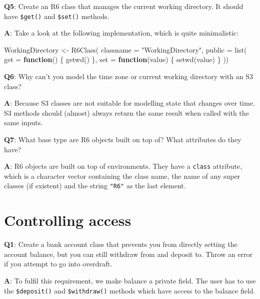 \documentclass[
]{krantz}
\makeatletter
\newenvironment{Shaded}{\begin{snugshade}}{\end{snugshade}}
\newcommand{\ControlFlowTok}[1]{\textcolor[rgb]{0.13,0.29,0.53}{\textbf{#1}}}
\newcommand{\DataTypeTok}[1]{\textcolor[rgb]{0.13,0.29,0.53}{#1}}
\newcommand{\KeywordTok}[1]{\textcolor[rgb]{0.13,0.29,0.53}{\textbf{#1}}}
\newcommand{\NormalTok}[1]{#1}
\newcommand{\StringTok}[1]{\textcolor[rgb]{0.31,0.60,0.02}{#1}}
\newenvironment{kframe}{%
\medskip{}
\setlength{\fboxsep}{.8em}
 \def\at@end@of@kframe{}%
 \ifinner\ifhmode%
  \def\at@end@of@kframe{\end{minipage}}%
  \begin{minipage}{\columnwidth}%
 \fi\fi%
 \def\FrameCommand##1{\hskip\@totalleftmargin \hskip-\fboxsep
 \colorbox{shadecolor}{##1}\hskip-\fboxsep
     \hskip-\linewidth \hskip-\@totalleftmargin \hskip\columnwidth}%
 \MakeFramed {\advance\hsize-\width
   \@totalleftmargin\z@ \linewidth\hsize
   \@setminipage}}%
 {\par\unskip\endMakeFramed%
 \at@end@of@kframe}
\renewenvironment{Shaded}{\begin{kframe}}{\end{kframe}}
\renewcommand{\KeywordTok} [1]{\textcolor[rgb]{0.00,0.44,0.13}{{#1}}}
\renewcommand{\DataTypeTok}[1]{\textcolor[rgb]{0.56,0.13,0.00}{{#1}}}
\renewcommand{\StringTok}  [1]{\textcolor[rgb]{0.25,0.44,0.63}{{#1}}}
\renewcommand{\NormalTok}  [1]{{#1}}
\makeatother
\begin{document}
\textbf{{Q5}}: Create an R6 class that manages the current working directory. It should have \texttt{\$get()} and \texttt{\$set()} methods.

\textbf{{A}}: Take a look at the following implementation, which is quite minimalistic:

\begin{Shaded}
\begin{Highlighting}[]
\NormalTok{WorkingDirectory <-}\StringTok{ }\KeywordTok{R6Class}\NormalTok{(}
  \DataTypeTok{classname =} \StringTok{"WorkingDirectory"}\NormalTok{, }
  \DataTypeTok{public =} \KeywordTok{list}\NormalTok{(}
    \DataTypeTok{get =} \ControlFlowTok{function}\NormalTok{() \{}
      \KeywordTok{getwd}\NormalTok{()}
\NormalTok{    \},}
    \DataTypeTok{set =} \ControlFlowTok{function}\NormalTok{(value) \{}
      \KeywordTok{setwd}\NormalTok{(value)}
\NormalTok{    \}}
\NormalTok{  ))}
\end{Highlighting}
\end{Shaded}

\textbf{{Q6}}: Why can't you model the time zone or current working directory with an S3 class?

\textbf{{A}}: Because S3 classes are not suitable for modelling state that changes over time. S3 methods should (almost) always return the same result when called with the same inputs.

\textbf{{Q7}}: What base type are R6 objects built on top of? What attributes do they have?

\textbf{{A}}: R6 objects are built on top of environments. They have a \texttt{class} attribute, which is a character vector containing the class name, the name of any super classes (if existent) and the string \texttt{"R6"} as the last element.

\hypertarget{controlling-access}{%
\section{Controlling access}\label{controlling-access}}

\textbf{{Q1}}: Create a bank account class that prevents you from directly setting the account balance, but you can still withdraw from and deposit to. Throw an error if you attempt to go into overdraft.

\textbf{{A}}: To fulfil this requirement, we make balance a private field. The user has to use the \texttt{\$deposit()} and \texttt{\$withdraw()} methods which have access to the balance field.
\end{document}
